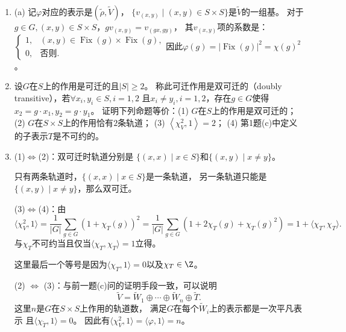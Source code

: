 \begin{enumerate}
        \item[\textbf{证明：}]
        (a) 记$\varphi$对应的表示是$(\tilde{\rho},\tilde{V})$，
        $\{v_{(x,y)}\mid (x,y) \in S \times S\}$是$\tilde{V}$的一组基。
        对于$g \in G,(x,y) \in S \times S$，$gv_{(x,y)} = v_{(gx,gy)}$，
        其$v_{(x,y)}$项的系数是：$\begin{cases} 1, & (x,y) \in \operatorname{Fix}(g) \times \operatorname{Fix}(g) ,\\
            0, &\text{否则}.
        \end{cases}$因此$\varphi(g) = |\operatorname{Fix}(g)|^2 = \chi(g)^2$。

        \item[(b)] 设$G$在$S$上的作用是可迁的且$|S|\ge2$。
        称此可迁作用是双可迁的（doubly transitive），若$\forall x_i,y_i\in S,i=1,2$
        且$x_i\ne y_i,i=1,2$，存在$g\in G$使得$x_2=g\cdot x_1,y_2=g\cdot y_1$。
        证明下列命题等价：(1) $G$在$S$上的作用是双可迁的；
        (2) $G$在$S\times S$上的作用恰有$2$条轨道；
        (3) $\left<\chi_V^2,1\right>=2$；
        (4) 第1题(c)中定义的子表示$T$是不可约的。
        
        \item[\textbf{证明：}]
        (1)$\Leftrightarrow$(2)：双可迁时轨道分别是
        $\{(x,x) \mid x \in S\}$和$\{(x,y) \mid x\neq y\}$。

        只有两条轨道时，$\{(x,x) \mid x \in S\}$是一条轨道，
        另一条轨道只能是$\{(x,y) \mid x\neq y\}$，那么双可迁。

        (3)$\Leftrightarrow$(4)：由
        \[\langle \chi_V^2,1 \rangle 
        = \frac{1}{|G|}\sum_{g \in G}(1+\chi_T(g))^2 
        = \frac{1}{|G|} \sum_{g \in G}(1+2\chi_T(g)+\chi_T(g)^2) 
        = 1+\langle \chi_T,\chi_T\rangle.\]
        与$\chi_T$不可约当且仅当$\langle \chi_T,\chi_T \rangle = 1$立得。

        这里最后一个等号是因为$\langle \chi_T,1 \rangle = 0$以及$ \chi_T \in \Z$。
        
        (2) $\Leftrightarrow$ (3)：与前一题(c)问的证明手段一致，可以说明
        \[\tilde{V} = \tilde{W}_1 \oplus \cdots \oplus \tilde{W}_n \oplus \tilde{T}.\]
        这里$n$是$G$在$S \times S$上作用的轨道数，
        满足$G$在每个$\tilde{W}_i$上的表示都是一次平凡表示
        且$\langle \chi_{\tilde{T}},1\rangle = 0$。
        因此有$\langle \chi_V^2 ,1 \rangle = \langle \varphi ,1 \rangle = n$。


\end{enumerate}
